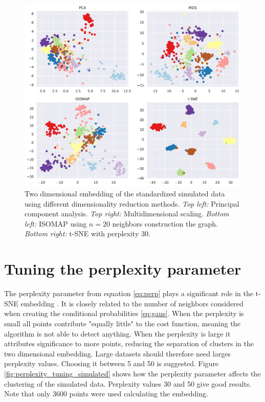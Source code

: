 \documentclass[a4paper]{memoir}
\theoremstyle{plain}
\theoremstyle{definition}
\theoremstyle{remark}
\begin{document}
\begin{figure}[tb]
        \centering
        \includegraphics[width=1\linewidth]{./code/figures/dimensionality_reduction.pdf}
        \caption{Two dimensional embedding of the standardized simulated data using different dimensionality reduction methods.
        \textit{Top left:} Principal component analysis. 
\textit{Top right:} Multidimensional scaling.
\textit{Bottom left:} ISOMAP using $n = 20$ neighbors construction the graph.
\textit{Bottom right:} t-SNE with perplexity $30$.}
        \label{fig:dimensionality_reduction}
\end{figure}


\section{Tuning the perplexity parameter}
The perplexity parameter from equation \eqref{eq:perp} plays a significant role in the t-SNE embedding \cite{hinton}.
It is closely related to the number of neighbors considered when creating the conditional probabilities \eqref{eq:gaus}.
When the perplexity is small all points contribute "equally little" to the cost function, meaning the algorithm is not able to detect anything.
When the perplexity is large it attributes significance to more points, reducing the separation of clusters in the two dimensional embedding.
Large datasets should therefore need larges perplexity values.
Choosing it between 5 and 50 is suggested.
Figure \ref{fig:perplexity_tuning_simulated} shows how the perplexity parameter affects the clustering of the simulated data.
Perplexity values 30 and 50 give good results.
Note that only 3600 points were used calculating the embedding.
\end{document}
